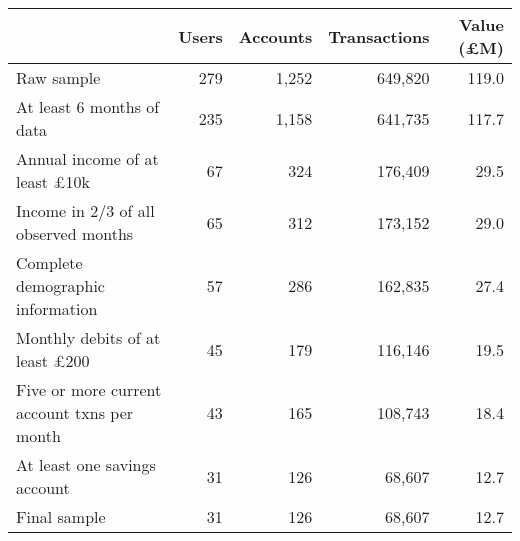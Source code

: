 \begin{tabular}{lrrrr}
\toprule
                                            & Users & Accounts & Transactions & Value (\pounds M) \\
\midrule
                                 Raw sample &   279 &    1,252 &      649,820 &             119.0 \\
                  At least 6 months of data &   235 &    1,158 &      641,735 &             117.7 \\
       Annual income of at least \pounds10k &    67 &      324 &      176,409 &              29.5 \\
       Income in 2/3 of all observed months &    65 &      312 &      173,152 &              29.0 \\
           Complete demographic information &    57 &      286 &      162,835 &              27.4 \\
      Monthly debits of at least \pounds200 &    45 &      179 &      116,146 &              19.5 \\
Five or more current account txns per month &    43 &      165 &      108,743 &              18.4 \\
               At least one savings account &    31 &      126 &       68,607 &              12.7 \\
                               Final sample &    31 &      126 &       68,607 &              12.7 \\
\bottomrule
\end{tabular}
